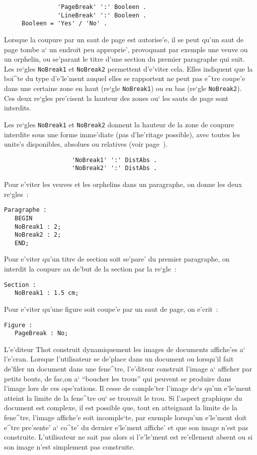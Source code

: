 {\begin{verbatim}
               'PageBreak' ':' Booleen .
               'LineBreak' ':' Booleen .
     Booleen = 'Yes' / 'No' .
\end{verbatim}

Lorsque la coupure par un saut de page est autorise'e, il se peut qu'un saut
de page tombe a` un endroit peu approprie', provoquant par exemple une veuve
ou un orphelin, ou
se'parant le titre d'une section du premier paragraphe qui suit. Les re`gles
{\tt NoBreak1} et {\tt NoBreak2} permettent d'e'viter cela. Elles indiquent
que la boi^te du type d'e'le'ment auquel elles se rapportent ne peut pas e^tre
coupe'e dans une certaine zone en haut (re`gle {\tt NoBreak1}) ou en bas
(re`gle {\tt NoBreak2}). Ces deux re`gles pre'cisent la hauteur des zones ou`
les sauts de page sont interdits.

Les re`gles {\tt NoBreak1} et {\tt NoBreak2} donnent la hauteur de la zone
de coupure interdite sous une forme imme'diate (pas d'he'ritage possible),
avec toutes les unite's disponibles, absolues ou relatives (voir
page~\pageref{unites}).

\begin{verbatim}
                   'NoBreak1' ':' DistAbs .
                   'NoBreak2' ':' DistAbs .
\end{verbatim}

\begin{example}
Pour e'viter les veuves et les orphelins dans un paragraphe, on donne les
deux re`gles~:
\begin{verbatim}
Paragraphe :
   BEGIN
   NoBreak1 : 2;
   NoBreak2 : 2;
   END;
\end{verbatim}
Pour e'viter qu'un titre de section soit se'pare' du premier paragraphe, on
interdit la coupure au de'but de la section par la re`gle~:
\begin{verbatim}
Section :
   NoBreak1 : 1.5 cm;
\end{verbatim}

Pour e'viter qu'une figure soit coupe'e par un saut de page, on e'crit~:
\begin{verbatim}
Figure :
   PageBreak : No;
\end{verbatim}
\end{example}

L'e'diteur Thot construit dynamiquement les images de documents affiche'es a`
l'e'cran. Lorsque l'utilisateur se de'place dans un document ou lorsqu'il fait
de'filer un document dans une fene^tre, l'e'diteur construit l'image a` afficher
par petits bouts, de fac,on a` ``boucher les trous'' qui peuvent se produire
dans l'image lors de ces ope'rations. Il cesse de comple'ter l'image de`s qu'un
e'le'ment atteint la limite de la fene^tre ou` se trouvait le trou. Si l'aspect
graphique du document est complexe, il est possible que, tout en atteignant
la limite de la fene^tre, l'image affiche'e soit incomple`te, par exemple
lorsqu'un e'le'ment doit e^tre pre'sente' a` co^te' du dernier e'le'ment affiche'
et que son image n'est pas construite. L'utilisateur ne sait pas alors si
l'e'le'ment est re'ellement absent ou si son image n'est simplement pas
construite.

}
